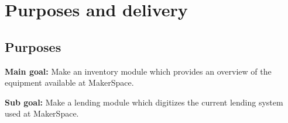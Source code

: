 

\section{Purposes and delivery}
\subsection{Purposes}


\textbf{Main goal:} Make an inventory module which provides an overview of the equipment available at MakerSpace.

\textbf{Sub goal:} Make a lending module which digitizes the current lending system used at MakerSpace.



